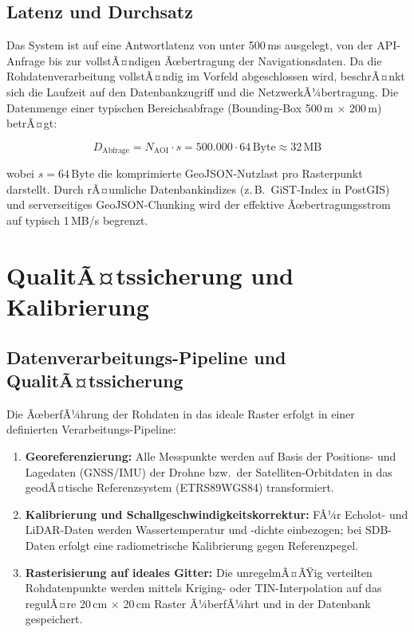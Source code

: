 ﻿\documentclass[a4paper,12pt]{article}
\theoremstyle{definition}
\begin{document}
\subsection{Latenz und Durchsatz}

Das System ist auf eine Antwortlatenz von unter 500\,ms ausgelegt, von der API-Anfrage
bis zur vollstÃ¤ndigen Ãœbertragung der Navigationsdaten. Da die Rohdatenverarbeitung
vollstÃ¤ndig im Vorfeld abgeschlossen wird, beschrÃ¤nkt sich die Laufzeit auf den
Datenbankzugriff und die NetzwerkÃ¼bertragung. Die Datenmenge einer typischen
Bereichsabfrage (Bounding-Box 500\,m $\times$ 200\,m) betrÃ¤gt:

\begin{equation}
  D_{\text{Abfrage}} = N_{\text{AOI}} \cdot s
  = 500.000 \cdot 64\,\text{Byte} \approx 32\,\text{MB}
\end{equation}

\noindent
wobei $s = 64\,\text{Byte}$ die komprimierte GeoJSON-Nutzlast pro Rasterpunkt darstellt.
Durch rÃ¤umliche Datenbankindizes (z.\,B.\ GiST-Index in PostGIS) und server\-seitiges
GeoJSON-Chunking wird der effektive Ãœbertragungsstrom auf typisch 1\,MB/s begrenzt.

\section{QualitÃ¤tssicherung und Kalibrierung}

\subsection{Datenverarbeitungs-Pipeline und QualitÃ¤tssicherung}

Die ÃœberfÃ¼hrung der Rohdaten in das ideale Raster erfolgt in einer definierten
Verarbeitungs-Pipeline:

\begin{enumerate}
  \item \textbf{Georeferenzierung:} Alle Messpunkte werden auf Basis der Positions-
        und Lagedaten (GNSS/IMU) der Drohne bzw.\ der Satelliten-Orbitdaten in das
        geodÃ¤tische Referenzsystem (ETRS89\/WGS84) transformiert.
  \item \textbf{Kalibrierung und Schallgeschwindigkeitskorrektur:} FÃ¼r Echolot- und
        LiDAR-Daten werden Wassertemperatur und -dichte einbezogen; bei SDB-Daten
        erfolgt eine radiometrische Kalibrierung gegen Referenzpegel.
  \item \textbf{Rasterisierung auf ideales Gitter:} Die unregelmÃ¤ÃŸig verteilten
        Rohdatenpunkte werden mittels Kriging- oder TIN-Interpolation auf das
        regulÃ¤re 20\,cm $\times$ 20\,cm Raster Ã¼berfÃ¼hrt und in der Datenbank gespeichert.
\end{enumerate}
\end{document}

